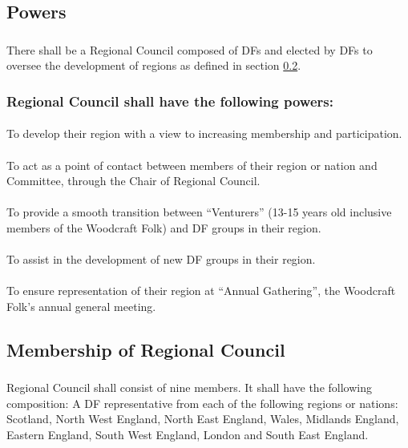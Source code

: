 \documentclass[a4paper, 12pt]{article}
\begin{document}
\subsection{Powers}
\subsubsection{}
There shall be a Regional Council composed of DFs and elected by DFs to oversee the development of regions as defined in section \ref{sec:rcmembership}.
\subsubsection{Regional Council shall have the following powers:}
\paragraph{}
To develop their region with a view to increasing membership and participation.
\paragraph{}
To act as a point of contact between members of their region or nation and Committee, through the Chair of Regional Council.
\paragraph{}
To provide a smooth transition between ``Venturers'' (13-15 years old inclusive members of the Woodcraft Folk) and DF groups in their region.
\paragraph{}
To assist in the development of new DF groups in their region.
\paragraph{}
To ensure representation of their region at ``Annual Gathering'', the Woodcraft Folk's annual general meeting.

\subsection{Membership of Regional Council}
\label{sec:rcmembership}
\subsubsection{}
Regional Council shall consist of nine members. It shall have the following composition: A DF representative from each of the following regions or nations: Scotland, North West England, North East England, Wales, Midlands England, Eastern England, South West England, London and South East England.
\end{document}
